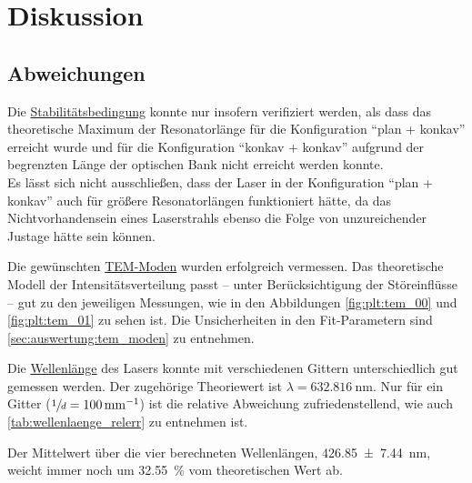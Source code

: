 \section{Diskussion}
\label{sec:diskussion}

\subsection{Abweichungen}
    Die \hyperref[sec:auswertung:stabilitaetsbedingung]{Stabilitätsbedingung} konnte nur insofern verifiziert werden,
    als dass das theoretische Maximum der Resonatorlänge
    für die Konfiguration \enquote{plan + konkav} erreicht wurde
    und für die Konfiguration \enquote{konkav + konkav} aufgrund der begrenzten Länge der optischen Bank nicht erreicht werden konnte.\\
    Es lässt sich nicht ausschließen,
    dass der Laser in der Konfiguration \enquote{plan + konkav} auch für größere Resonatorlängen funktioniert hätte,
    da das Nichtvorhandensein eines Laserstrahls ebenso die Folge von unzureichender Justage hätte sein können.

    Die gewünschten \hyperref[sec:auswertung:tem_moden]{TEM-Moden} wurden erfolgreich vermessen.
    Das theoretische Modell der Intensitätsverteilung passt
    – unter Berücksichtigung der Störeinflüsse –
    gut zu den jeweiligen Messungen,
    wie in den Abbildungen \ref{fig:plt:tem_00} und \ref{fig:plt:tem_01} zu sehen ist.
    Die Unsicherheiten in den Fit-Parametern sind \autoref{sec:auswertung:tem_moden} zu entnehmen.





    Die \hyperref[sec:auswertung:wellenlaenge]{Wellenlänge} des Lasers konnte mit verschiedenen Gittern unterschiedlich gut gemessen werden.
    Der zugehörige Theoriewert ist $\lambda = \SI{632.816}{\nano\meter}$.
    Nur für ein Gitter ($\sfrac{1}{d} = \SI[per-mode=reciprocal]{100}{\per\milli\meter}$)
    ist die relative Abweichung zufriedenstellend,
    wie auch \autoref{tab:wellenlaenge_relerr} zu entnehmen ist.

    Der Mittelwert über die vier berechneten Wellenlängen,
    \SI{426.85 \pm 7.44}{\nano\meter},
    weicht immer noch um \SI{32.55}{\percent} vom theoretischen Wert ab.


